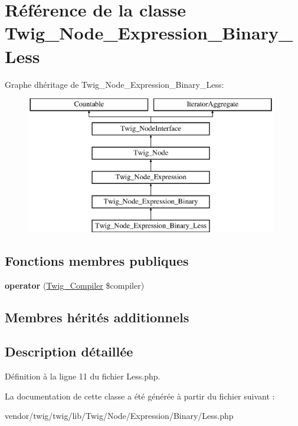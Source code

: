 \hypertarget{class_twig___node___expression___binary___less}{}\section{Référence de la classe Twig\+\_\+\+Node\+\_\+\+Expression\+\_\+\+Binary\+\_\+\+Less}
\label{class_twig___node___expression___binary___less}
Graphe d\textquotesingle{}héritage de Twig\+\_\+\+Node\+\_\+\+Expression\+\_\+\+Binary\+\_\+\+Less\+:\begin{figure}[H]
\begin{center}
\leavevmode
\includegraphics[height=6.000000cm]{class_twig___node___expression___binary___less}
\end{center}
\end{figure}
\subsection*{Fonctions membres publiques}
\begin{DoxyCompactItemize}
\item 
{\bfseries operator} (\hyperlink{class_twig___compiler}{Twig\+\_\+\+Compiler} \$compiler)\hypertarget{class_twig___node___expression___binary___less_af77318ec88d5f8a508684970a150b670}{}\label{class_twig___node___expression___binary___less_af77318ec88d5f8a508684970a150b670}

\end{DoxyCompactItemize}
\subsection*{Membres hérités additionnels}


\subsection{Description détaillée}


Définition à la ligne 11 du fichier Less.\+php.



La documentation de cette classe a été générée à partir du fichier suivant \+:\begin{DoxyCompactItemize}
\item 
vendor/twig/twig/lib/\+Twig/\+Node/\+Expression/\+Binary/Less.\+php\end{DoxyCompactItemize}
